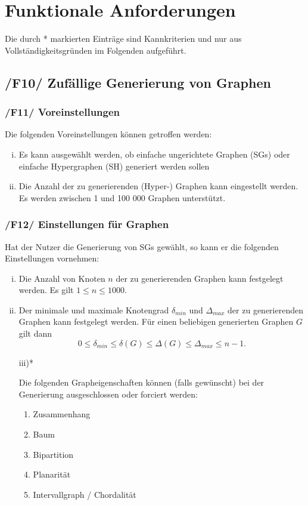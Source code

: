 \documentclass{article}
\begin{document}
	
	
	\newpage
	\section{Funktionale Anforderungen}
	Die durch * markierten Einträge sind Kannkriterien und nur aus Vollständigkeitsgründen im Folgenden aufgeführt.
	
	\subsection*{/F10/ Zufällige Generierung von Graphen} \label{f10} 
	
	\subsubsection*{/F11/ Voreinstellungen} \label{f11} 
	
	Die folgenden Voreinstellungen können getroffen werden:
	\begin{enumerate}[i)]
		\item{Es kann ausgewählt werden, ob einfache ungerichtete Graphen (SGs) oder einfache Hypergraphen (SH) generiert werden sollen}
		\item{Die Anzahl der zu generierenden (Hyper-) Graphen kann eingestellt werden. Es werden zwischen 1 und 100 000 Graphen unterstützt.}
	\end{enumerate}
	
	\subsubsection*{/F12/ Einstellungen für Graphen} \label{f12} 
	Hat der Nutzer die Generierung von SGs gewählt, so kann er die folgenden Einstellungen vornehmen:
	\begin{enumerate}[i)]
		\item{Die Anzahl von Knoten $n$ der zu generierenden Graphen kann festgelegt werden. Es gilt $1 \leq n \leq 1000$.}
		\item{Der minimale und maximale Knotengrad $\delta_{min}$ und $\Delta_{max}$ der zu generierenden Graphen kann festgelegt werden. Für einen beliebigen generierten Graphen $G$ gilt dann $$0 \leq \delta_{min} \leq \delta(G) \leq \Delta(G) \leq \Delta_{max} \leq n-1.$$}
		\item[iii)*]{Die folgenden Grapheigenschaften können (falls gewünscht) bei der Generierung ausgeschlossen oder forciert werden:
			\begin{enumerate}[--]
				\item{Zusammenhang}
				\item{Baum}
				\item{Bipartition}
				\item{Planarität}
				\item{Intervallgraph / Chordalität}
			\end{enumerate}
		}
	\end{enumerate}
	
\end{document}
